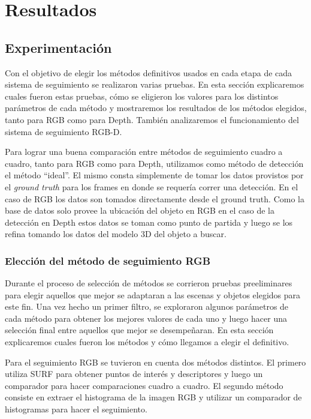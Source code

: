 \chapter{Resultados}
\section{Experimentación}
Con el objetivo de elegir los métodos definitivos usados en cada etapa de cada sistema de seguimiento se realizaron varias pruebas. En esta sección explicaremos cuales fueron estas pruebas, cómo se eligieron los valores para los distintos parámetros de cada método y mostraremos los resultados de los métodos elegidos, tanto para RGB como para Depth. También analizaremos el funcionamiento del sistema de seguimiento RGB-D.

Para lograr una buena comparación entre métodos de seguimiento cuadro a cuadro, tanto para RGB como para Depth, utilizamos como método de detección el método ``ideal''. El mismo consta simplemente de tomar los datos provistos por el \textit{ground truth} para los frames en donde se requería correr una detección. En el caso de RGB los datos son tomados directamente desde el ground truth. Como la base de datos solo provee la ubicación del objeto en RGB en el caso de la detección en Depth estos datos se toman como punto de partida y luego se los refina tomando los datos del modelo 3D del objeto a buscar.

\subsection{Elección del método de seguimiento RGB}
Durante el proceso de selección de métodos se corrieron pruebas preeliminares para elegir aquellos que mejor se adaptaran a las escenas y objetos elegidos para este fin. Una vez hecho un primer filtro, se exploraron algunos parámetros de cada método para obtener los mejores valores de cada uno y luego hacer una selección final entre aquellos que mejor se desempeñaran. En esta sección explicaremos cuales fueron los métodos y cómo llegamos a elegir el definitivo.

Para el seguimiento RGB se tuvieron en cuenta dos métodos distintos. El primero utiliza SURF \cite{surf} para obtener puntos de interés y descriptores y luego un comparador para hacer comparaciones cuadro a cuadro. El segundo método consiste en extraer el histograma de la imagen RGB y utilizar un comparador de histogramas para hacer el seguimiento.

